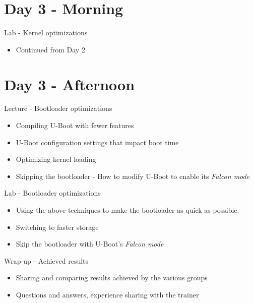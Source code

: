 \documentclass[a4paper,12pt,obeyspaces,spaces,hyphens]{article}
\begin{document}
\section{Day 3 - Morning}

\feagendaonecolumn
{Lab - Kernel optimizations}
{
 \begin{itemize}
 \item Continued from Day 2
 \end{itemize}
}

\section{Day 3 - Afternoon}

\feagendatwocolumn
{Lecture - Bootloader optimizations}
{
  \begin{itemize}
  \item Compiling U-Boot with fewer features
  \item U-Boot configuration settings that impact boot time
  \item Optimizing kernel loading
  \item Skipping the bootloader - How to modify U-Boot to
        enable its {\em Falcon mode}
  \end{itemize}
}
{Lab - Bootloader optimizations}
{
 \begin{itemize}
 \item Using the above techniques to make the bootloader
    as quick as possible.
 \item Switching to faster storage
 \item Skip the bootloader with U-Boot's {\em Falcon mode}
 \end{itemize}
}

\feagendaonecolumn
{Wrap-up - Achieved results}
{
 \begin{itemize}
 \item Sharing and comparing results achieved by the various groups
 \item Questions and answers, experience sharing with the trainer
 \end{itemize}
}
\end{document}
